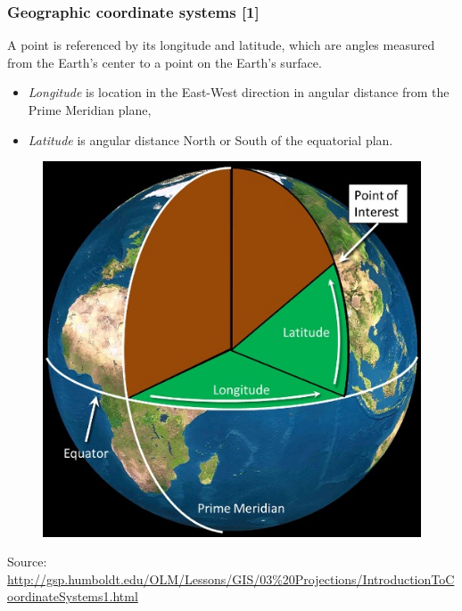 \documentclass[11pt]{beamer}
\begin{document}
\begin{frame}
\frametitle{Geographic coordinate systems [1]}
\small{A point is referenced by its longitude and latitude, which are angles measured from the Earth's center to a point on the Earth's surface.
\begin{itemize} %
  \item \emph{Longitude} is location in the East-West direction in angular distance from the Prime Meridian plane, %
  \item \emph{Latitude} is angular distance North or South of the equatorial plan. %
\end{itemize}
}
\begin{figure}
\includegraphics[scale=0.50]{GCS.jpg}
\end{figure}
\tiny{Source: \url{http://gsp.humboldt.edu/OLM/Lessons/GIS/03\%20Projections/IntroductionToCoordinateSystems1.html}}
\end{frame}
\end{document}
